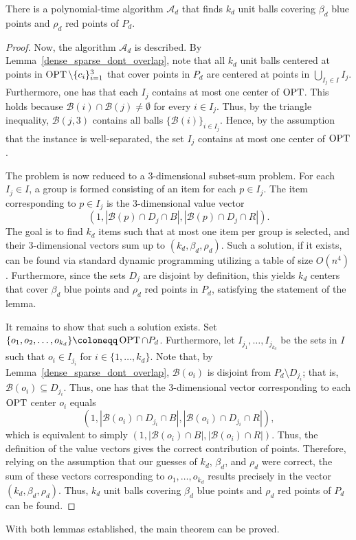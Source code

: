 \begin{lemma}
    \label{dense_algo}
    There is a polynomial-time algorithm $\mathcal{A}_d$ that finds $k_d$ unit balls covering $\beta_d$ blue points and $\rho_d$ red points of $P_d$.
\end{lemma}
\begin{proof}
Now, the algorithm $\mathcal{A}_d$ is described.
By Lemma~\ref{dense_sparse_dont_overlap}, note that all $k_d$ unit balls centered at points in $\operatorname{OPT} \setminus \{c_i\}_{i=1}^3$ that cover points in $P_d$ are centered at points in $\bigcup_{I_j \in I} I_j$. Furthermore, one has that each $I_j$ contains at most one center of $\operatorname{OPT}$. This holds because $\mathcal{B}(i) \cap \mathcal{B}(j) \neq \emptyset$ for every $i \in I_j$. Thus, by the triangle inequality, $\mathcal{B}(j, 3)$ contains all balls $\{\mathcal{B}(i)\}_{i \in I_j}$. Hence, by the assumption that the instance is well-separated, the set $I_j$ contains at most one center of $\operatorname{OPT}$.

The problem is now reduced to a 3-dimensional subset-sum problem. For each $I_j \in I$, a group is formed consisting of an item for each $p \in I_j$. The item corresponding to $p \in I_j$ is the 3-dimensional value vector
$$(1, |\mathcal{B}(p) \cap D_j \cap B|, |\mathcal{B}(p) \cap D_j \cap R|).$$
The goal is to find $k_d$ items such that at most one item per group is selected, and their 3-dimensional vectors sum up to $(k_d, \beta_d, \rho_d)$. Such a solution, if it exists, can be found via standard dynamic programming utilizing a table of size $O(n^4)$. Furthermore, since the sets $D_j$ are disjoint by definition, this yields $k_d$ centers that cover $\beta_d$ blue points and $\rho_d$ red points in $P_d$, satisfying the statement of the lemma.

It remains to show that such a solution exists. Set $\{o_1, o_2, \ldots, o_{k_d}\} \coloneqq \OPT \cap P_d$. Furthermore, let $I_{j_1}, \ldots, I_{j_{k_d}}$ be the sets in $I$ such that $o_i \in I_{j_i}$ for $i \in \{1, \ldots, k_d\}$. Note that, by Lemma~\ref{dense_sparse_dont_overlap}, $\mathcal{B}(o_i)$ is disjoint from $P_d \setminus D_{j_i}$; that is, $\mathcal{B}(o_i) \subseteq D_{j_i}$. Thus, one has that the 3-dimensional vector corresponding to each $\operatorname{OPT}$ center $o_i$ equals
$$(1, |\mathcal{B}(o_i) \cap D_{j_i} \cap B|, |\mathcal{B}(o_i) \cap D_{j_i} \cap R|),$$
which is equivalent to simply $(1, |\mathcal{B}(o_i) \cap B|, |\mathcal{B}(o_i) \cap R|)$. Thus, the definition of the value vectors gives the correct contribution of points. Therefore, relying on the assumption that our guesses of $k_d$, $\beta_d$, and $\rho_d$ were correct, the sum of these vectors corresponding to $o_1, \ldots, o_{k_d}$ results precisely in the vector $(k_d, \beta_d, \rho_d)$. Thus, $k_d$ unit balls covering $\beta_d$ blue points and $\rho_d$ red points of $P_d$ can be found.
\end{proof}
With both lemmas established, the main theorem can be proved.

